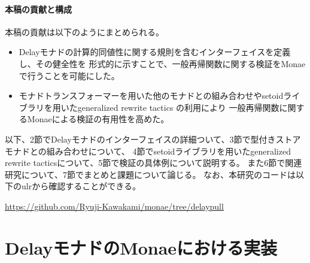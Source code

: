 \documentclass[japanese]{jssst_ppl}
\theoremstyle{definition}
\begin{document}
\paragraph{本稿の貢献と構成}
本稿の貢献は以下のようにまとめられる。
\begin{itemize}
  \item Delayモナドの計算的同値性に関する規則を含むインターフェイスを定義し、その健全性を
        形式的に示すことで、一般再帰関数に関する検証をMonaeで行うことを可能にした。
  \item モナドトランスフォーマーを用いた他のモナドとの組み合わせやsetoidライブラリを用いたgeneralized rewrite tactics の利用により
        一般再帰関数に関するMonaeによる検証の有用性を高めた。
\end{itemize}
以下、2節でDelayモナドのインターフェイスの詳細ついて、3節で型付きストアモナドとの組み合わせについて、
4節でsetoidライブラリを用いたgeneralized rewrite tacticsについて、5節で検証の具体例について説明する。
また6節で関連研究について、7節でまとめと課題について論じる。
なお、本研究のコードは以下のulrから確認することができる。\\
\begin{center}
  \url{https://github.com/Ryuji-Kawakami/monae/tree/delaypull}
\end{center}

\section{DelayモナドのMonaeにおける実装}
\end{document}
